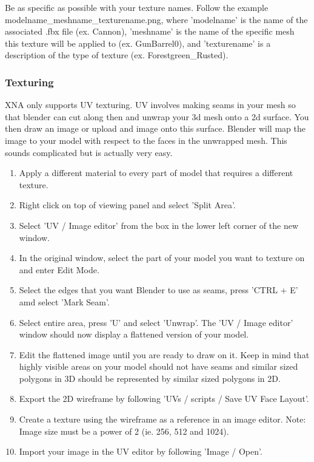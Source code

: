 Be as specific as possible with your texture names. Follow the example modelname\_meshname\_texturename.png, where 'modelname' is the name of the associated .fbx file (ex. Cannon), 'meshname' is the name of the specific mesh this texture will be applied to (ex. GunBarrel0), and 'texturename' is a description of the type of texture (ex. Forestgreen\_Rusted).


\subsubsection {Texturing}
XNA only supports UV texturing. UV involves making seams in your mesh so that blender can cut along then and unwrap your 3d mesh onto a 2d surface. You then draw an image or upload and image onto this surface. Blender will map the image to your model with respect to the faces in the unwrapped mesh. This sounds complicated but is actually very easy.

\begin{enumerate}
	\item Apply a different material to every part of model that requires a different texture.
	\item Right click on top of viewing panel and select 'Split Area'.
	\item Select 'UV / Image editor' from the box in the lower left corner of the new window.
	\item In the original window, select the part of your model you want to texture on and enter Edit Mode.
	\item Select the edges that you want Blender to use as seams, press 'CTRL + E' amd select 'Mark Seam'.
	\item Select entire area, press 'U' and select 'Unwrap'. The 'UV / Image editor' window should now display a flattened version of your model.
	\item Edit the flattened image until you are ready to draw on it. Keep in mind that highly visible areas on your model should not have seams and similar sized polygons in 3D should be represented by similar sized polygons in 2D.
	\item Export the 2D wireframe by following 'UVs / scripts / Save UV Face Layout'.
	\item Create a texture using the wireframe as a reference in an image editor. Note: Image size must be a power of 2 (ie. 256, 512 and 1024).
	\item Import your image in the UV editor by following 'Image / Open'.
\end{enumerate}

